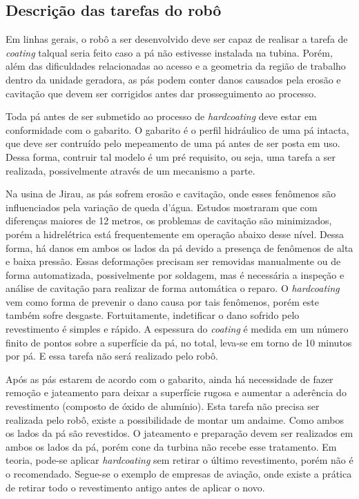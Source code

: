 \subsection{Descrição das tarefas do robô}


Em linhas gerais, o robô a ser desenvolvido deve ser capaz de realisar a tarefa
de \textit{coating} talqual seria feito caso a pá não estivesse instalada na
tubina. Porém, além das dificuldades relacionadas ao acesso e a geometria da
região de trabalho dentro da unidade geradora, as pás podem conter danos
causados pela erosão e cavitação que devem ser corrigidos antes dar
prosseguimento ao processo.

Toda pá antes de ser submetido ao processo de \textit{hardcoating} deve estar em
conformidade com o gabarito. O gabarito é o perfil hidráulico de uma pá intacta,
que deve ser contruído pelo mepeamento de uma pá antes de ser posta em uso.
Dessa forma, contruir tal modelo é um pré requisito, ou seja, uma tarefa a ser
realizada, possivelmente através de um mecanismo a parte. 

Na usina de Jirau, as pás sofrem erosão e cavitação, onde esses fenômenos são
influenciados pela variação de queda d'água. Estudos mostraram que com
diferenças maiores de 12 metros, os problemas de cavitação são minimizados,
porém a hidrelétrica está frequentemente em operação abaixo desse nível.
Dessa forma, há danos em ambos os lados da pá devido a presença de fenômenos de
alta e baixa pressão. Essas deformações precisam ser removidas manualmente ou de
forma automatizada, possivelmente por soldagem, mas é necessária a inspeção e
análise de cavitação para realizar de forma automática o reparo. O
\textit{hardcoating} vem como forma de prevenir o dano causa por tais fenômenos,
porém este também sofre desgaste. Fortuitamente, indetificar o dano sofrido pelo
revestimento é simples e rápido. A espessura do \textit{coating} é medida em um
número finito de pontos sobre a superfície da pá, no total, leva-se em torno de
10 minutos por pá. E essa tarefa não será realizado pelo robô.

Após as pás estarem de acordo com o gabarito, ainda há necessidade de fazer
remoção e jateamento para deixar a superfície rugosa e aumentar a aderência do
revestimento (composto de óxido de alumínio). Esta tarefa não precisa ser
realizada pelo robô, existe a possibilidade de montar um andaime. Como ambos os
lados da pá são revestidos. O jateamento e preparação devem ser realizados em
ambos os lados da pá, porém cone da turbina não recebe esse tratamento. Em
teoria, pode-se aplicar \textit{hardcoating} sem retirar o último revestimento,
porém não é o recomendado. Segue-se o exemplo de empresas de aviação, onde
existe a prática de retirar todo o revestimento antigo antes de aplicar o novo.

